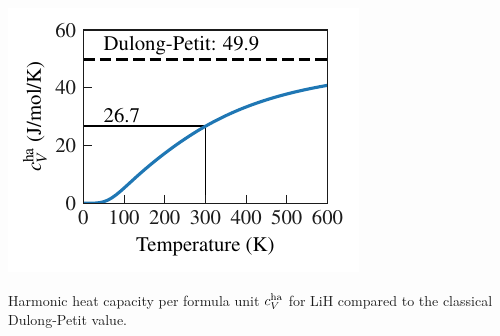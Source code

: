 \begin{marginfigure}
	\includegraphics[width=\textwidth]{./data/plots/heat_capacity/225.LiH/thermal_properties.pdf}
	\caption{Harmonic heat capacity per formula unit $c_V^{\rm ha}$ for LiH compared to the classical Dulong-Petit value.}
	\label{fig:LiH.cv}
\end{marginfigure}
%
